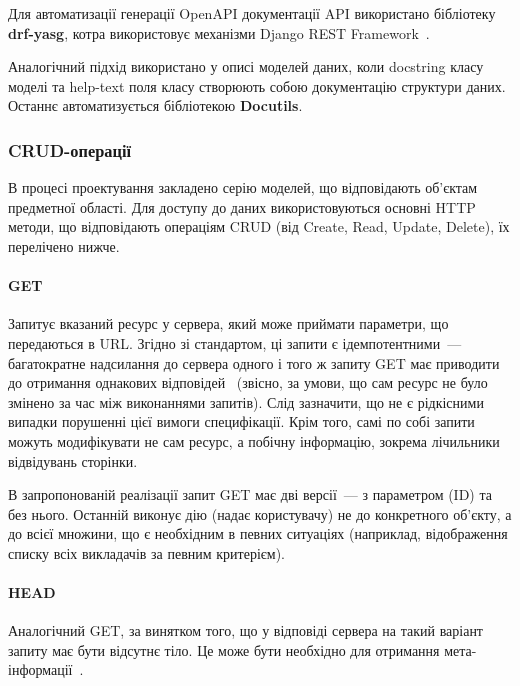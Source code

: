 Для автоматизації генерації OpenAPI документації API використано бібліотеку \textbf{drf-yasg}, котра використовує механізми Django REST Framework~\cite{hillar2018django}. 

Аналогічний підхід використано у описі моделей даних, коли docstring класу~\cite{hellmann2011python} моделі та help-text поля класу створюють собою документацію структури даних. Останнє автоматизується бібліотекою \textbf{Docutils}. 


\subsubsection{CRUD-операції} \label{subs:crud}

В процесі проектування закладено серію моделей, що відповідають об’єктам предметної області. Для доступу до даних використовуються основні HTTP методи, що відповідають операціям CRUD (від Create, Read, Update, Delete), їх перелічено нижче.

\paragraph{GET}

Запитує вказаний ресурс у сервера, який може приймати параметри, що передаються в URL. Згідно зі стандартом, ці запити є ідемпотентними~--- багатократне надсилання до сервера одного і того ж запиту GET має приводити до отримання однакових відповідей~\cite{berners1996hypertext} (звісно, за умови, що сам ресурс не було змінено за час між виконаннями запитів). Слід зазначити, що не є рідкісними випадки порушенні цієї вимоги специфікації. Крім того, самі по собі запити можуть модифікувати не сам ресурс, а побічну інформацію, зокрема лічильники відвідувань сторінки.

В запропонованій реалізації запит GET має дві версії~--- з параметром (ID) та без нього. Останній виконує дію (надає користувачу) не до конкретного об’єкту, а до всієї множини, що є необхідним в певних ситуаціях (наприклад, відображення списку всіх викладачів за певним критерієм).

\paragraph{HEAD}

Аналогічний GET, за винятком того, що у відповіді сервера на такий варіант запиту має бути відсутнє тіло. Це може бути необхідно для отримання мета-інформації~\cite{berners1996hypertext}.

